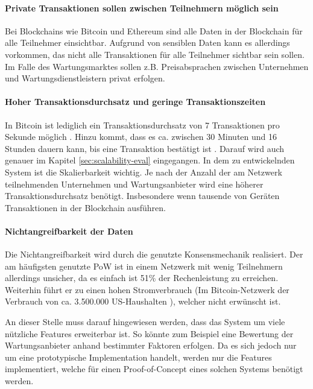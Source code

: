 \paragraph{Private Transaktionen sollen zwischen Teilnehmern möglich sein}
Bei Blockchains wie Bitcoin und Ethereum sind alle Daten in der Blockchain für alle Teilnehmer einsichtbar. Aufgrund von sensiblen Daten kann es allerdings vorkommen, das nicht alle Transaktionen für alle Teilnehmer sichtbar sein sollen. Im Falle des Wartungsmarktes sollen z.B. Preisabsprachen zwischen Unternehmen und Wartungsdienstleistern privat erfolgen.

\paragraph{Hoher Transaktionsdurchsatz und geringe Transaktionszeiten}
In Bitcoin ist lediglich ein Transaktionsdurchsatz von 7 Transaktionen pro Sekunde möglich \cite{ZhengBlockchainChallengesOpportunities2017}. Hinzu kommt, dass es ca. zwischen 30 Minuten und 16 Stunden dauern kann, bis eine Transaktion bestätigt ist \cite{BuchkoHowLongBitcoin2017}. Darauf wird auch genauer im Kapitel \ref{sec:scalability-eval} eingegangen. In dem zu entwickelnden System ist die Skalierbarkeit wichtig. Je nach der Anzahl der am Netzwerk teilnehmenden Unternehmen und Wartungsanbieter wird eine höherer Transaktionsdurchsatz benötigt. Insbesondere wenn tausende von Geräten Transaktionen in der Blockchain ausführen.

\paragraph{Nichtangreifbarkeit der Daten}
Die Nichtangreifbarkeit wird durch die genutzte Konsensmechanik realisiert. Der am häufigsten genutzte PoW ist in einem Netzwerk mit wenig Teilnehmern allerdings unsicher, da es einfach ist 51\% der Rechenleistung zu erreichen. Weiterhin führt er zu einen hohen Stromverbrauch (Im Bitcoin-Netzwerk der Verbrauch von ca. 3.500.000 US-Haushalten \cite{DigiconomistBitcoinEnergyConsumption}), welcher nicht erwünscht ist.

An dieser Stelle muss darauf hingewiesen werden, dass das System um viele nützliche Features erweiterbar ist. So könnte zum Beispiel eine Bewertung der Wartungsanbieter anhand bestimmter Faktoren erfolgen. Da es sich jedoch nur um eine prototypische Implementation handelt, werden nur die Features implementiert, welche für einen Proof-of-Concept eines solchen Systems benötigt werden.


